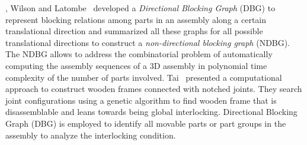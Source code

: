 , Wilson and Latombe~ developed a {\em Directional Blocking Graph} (DBG)  to represent blocking relations among parts in an assembly along a certain translational direction and summarized all these graphs for all possible translational directions to construct a {\em non-directional blocking graph} (NDBG).
The NDBG allows to address the combinatorial problem of automatically computing the assembly sequences of a 3D assembly in polynomial time complexity of the number of parts involved. 
Tai~  presented a computational approach to construct wooden frames connected with notched joints.
They search  joint configurations using a  genetic algorithm to find wooden frame that is disassemblable and leans towards being global interlocking.
Directional Blocking Graph (DBG) is employed to identify all movable parts or part groups in the assembly to analyze the interlocking condition.
\fi

















